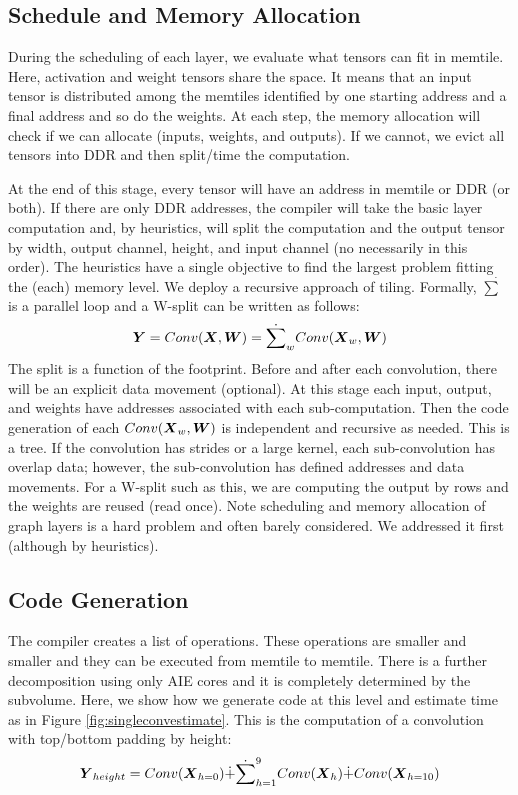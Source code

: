 \documentclass[sigconf]{acmart}
\begin{document}
\subsection{Schedule and Memory Allocation}
During the scheduling of each layer, we evaluate what tensors can fit
in memtile. Here, activation and weight tensors share the space. It
means that an input tensor is distributed among the memtiles
identified by one starting address and a final address and so do the
weights. At each step, the memory allocation will check if we can
allocate (inputs, weights, and outputs). If we cannot, we evict all
tensors into DDR and then split/time the computation.

At the end of this stage, every tensor will have an address in memtile
or DDR (or both). If there are only DDR addresses, the compiler will
take the basic layer computation and, by heuristics, will split the
computation and the output tensor by width, output channel, height,
and input channel (no necessarily in this order). The heuristics have
a single objective to find the largest problem fitting the (each)
memory level. We deploy a recursive approach of tiling.  Formally,
$\dot{\sum}$ is a parallel loop and a W-split can be written as
follows:
\begin{equation}
  {\boldsymbol Y} =  Conv({\boldsymbol X},{\boldsymbol W}) = \dot{\sum}_w
  Conv({\boldsymbol X}_w,{\boldsymbol W})
\end{equation}
The split is a function of the footprint. Before and after each
convolution, there will be an explicit data movement (optional). At
this stage each input, output, and weights have addresses associated
with each sub-computation. Then the code generation of each
$Conv({\boldsymbol X}_w,{\boldsymbol W})$ is independent and recursive as needed. This
is a tree. If the convolution has strides or a large kernel, each
sub-convolution has overlap data; however, the sub-convolution has
defined addresses and data movements. For a W-split such as this, we
are computing the output by rows and the weights are reused (read
once). Note scheduling and memory allocation of graph layers is a hard
problem and often barely considered. We addressed it first (although
by heuristics).

\subsection{Code Generation }
The compiler creates a list of operations. These operations are
smaller and smaller and they can be executed from memtile to
memtile. There is a further decomposition using only AIE cores and it
is completely determined by the subvolume. Here, we show how we
generate code at this level and estimate time as in Figure
\ref{fig:singleconvestimate}.  This is the computation of a
convolution with top/bottom padding by height:
\begin{equation}
  \label{eq:convpadding}
  {\boldsymbol Y}_{height} =   Conv({\boldsymbol X}_{h=0}) \dot{+} \dot{\sum}_{h=1}^9
  Conv({\boldsymbol X}_h) \dot{+} Conv({\boldsymbol X}_{h=10})
\end{equation}
\end{document}
